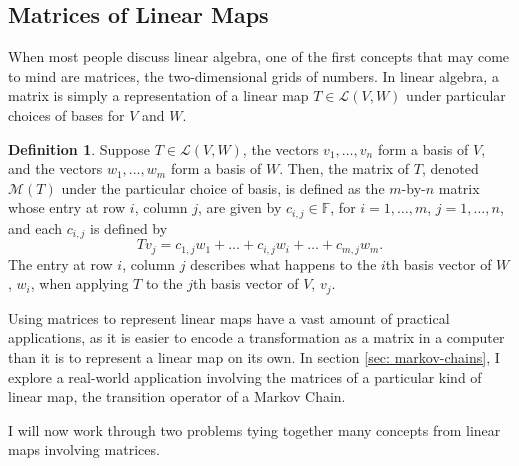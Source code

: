 \documentclass{article}
\renewcommand{\L}{\mathcal{L}}
\newcommand{\F}{\mathbb{F}}
\newcommand{\M}{\mathcal{M}}
\theoremstyle{definition}
\newtheorem{definition}{Definition}
\begin{document}
\subsection{Matrices of Linear Maps}

When most people discuss linear algebra, one of the first concepts that may come to mind are matrices, the two-dimensional grids of numbers. In linear algebra, a matrix is simply a representation of a linear map $T \in \L(V, W)$ under particular choices of bases for $V$ and $W$.

\begin{definition}
    Suppose $T \in \L(V, W)$, the vectors $v_1, \dots, v_n$ form a basis of $V$, and the vectors $w_1, \dots, w_m$ form a basis of $W$. Then, the matrix of $T$, denoted $\M(T)$ under the particular choice of basis, is defined as the $m$-by-$n$ matrix whose entry at row $i$, column $j$, are given by $c_{i, j} \in \F$, for $i = 1, \dots, m$, $j = 1, \dots, n$, and each $c_{i, j}$ is defined by $$Tv_j = c_{1, j}w_1 + \dots + c_{i, j}w_i + \dots + c_{m, j}w_m.$$ The entry at row $i$, column $j$ describes what happens to the $i$th basis vector of $W$, $w_i$, when applying $T$ to the $j$th basis vector of $V$, $v_j$.
\end{definition}

Using matrices to represent linear maps have a vast amount of practical applications, as it is easier to encode a transformation as a matrix in a computer than it is to represent a linear map on its own. In section \ref{sec: markov-chains}, I explore a real-world application involving the matrices of a particular kind of linear map, the transition operator of a Markov Chain.

I will now work through two problems tying together many concepts from linear maps involving matrices.
\end{document}
